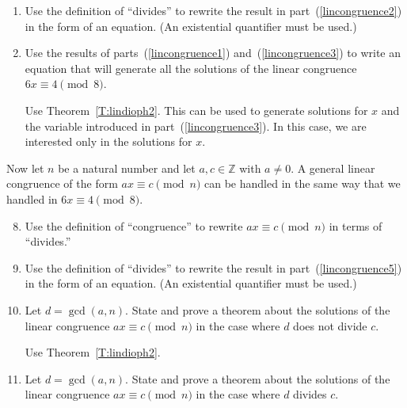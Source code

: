\begin{enumerate}
\begin{enumerate}
\item Use the definition of ``divides'' to rewrite the result in part~(\ref{lincongruence2}) in the form of an equation.  (An existential quantifier must be used.) \label{lincongruence3}

\item Use the results of parts~(\ref{lincongruence1}) and~(\ref{lincongruence3}) to write an equation that will generate all the solutions of the linear congruence 
$6x \equiv 4 \pmod 8$.

\hint  Use Theorem~\ref{T:lindioph2}.  This can be used to generate solutions for $x$ and the variable introduced in part~(\ref{lincongruence3}).  In this case, we are interested only in the  solutions for $x$.

\end{enumerate}
Now let $n$ be a natural number and let $a, c \in \mathbb{Z}$ with $a \ne 0$.  A general linear congruence of the form $ax \equiv c \pmod n$ can be handled in the same way that we handled in 
$6x \equiv 4 \pmod 8$.

\begin{enumerate}
\setcounter{enumii}{7}
\item Use the definition of ``congruence'' to rewrite $ax \equiv c \pmod n$ in terms of ``divides.'' \label{lincongruence5}

\item Use the definition of ``divides'' to rewrite the result in part~(\ref{lincongruence5}) in the form of an equation.  (An existential quantifier must be used.) \label{lincongruence6}

\item Let $d = \gcd( {a, n} )$.  State and prove a theorem about the solutions of the linear congruence $ax \equiv c \pmod n$ in the case where $d$ does not divide $c$.

\hint  Use Theorem~\ref{T:lindioph2}.

\item Let $d = \gcd( {a, n} )$.  State and prove a theorem about the solutions of the linear congruence $ax \equiv c \pmod n$ in the case where $d$ divides $c$.

\end{enumerate}

\end{enumerate}



\hbreak






\endinput
